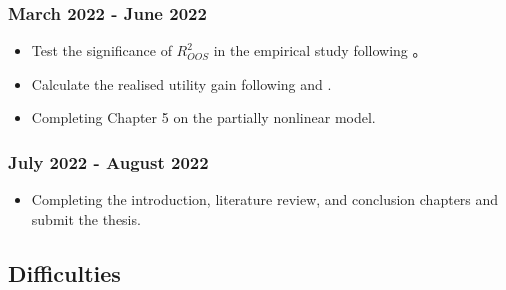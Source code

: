 \documentclass[a4paper,12pt,times,numbered,print,index]{report}
\numberwithin{equation}{section}
\begin{document}
\subsubsection{March 2022 - June 2022}
\begin{itemize}
    \item Test the significance of $R^{2}_{OOS}$ in the empirical study following \cite{clark2007approximately}。
    \item Calculate the realised utility gain following \cite{campbell2008predicting} and \cite{neely2014forecasting}.
    \item Completing Chapter 5 on the partially nonlinear model.
\end{itemize}
\subsubsection {July 2022 - August 2022}
\begin{itemize}
    \item Completing the introduction, literature review, and conclusion chapters and submit the thesis.
\end{itemize}

\subsection{Difficulties}


{\footnotesize
	
	
}
	
\end{document}
